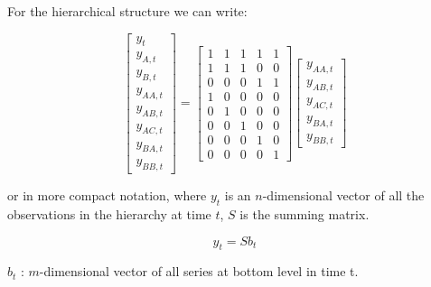 \documentclass[c, dvipsnames]{beamer}  %
\begin{document}
\begin{frame}[shrink=5]
\frametitle{\insertsection} 
\framesubtitle{\insertsubsection}


For the hierarchical structure we can write: 

\[\begin{bmatrix}
y_{t} \\
y_{A, t} \\
y_{B, t} \\
y_{AA, t} \\
y_{AB, t} \\
y_{AC, t} \\
y_{BA, t} \\
y_{BB, t}
\end{bmatrix}
=
\begin{bmatrix}
1 & 1 & 1 & 1 & 1 \\
1 & 1 & 1 & 0 & 0 \\
0 & 0 & 0 & 1 & 1 \\
1  & 0  & 0  & 0  & 0  \\
0  & 1  & 0  & 0  & 0  \\
0  & 0  & 1  & 0  & 0  \\
0  & 0  & 0  & 1  & 0  \\
0  & 0  & 0  & 0  & 1
\end{bmatrix}
\begin{bmatrix}
y_{AA, t} \\
y_{AB, t} \\
y_{AC, t} \\
y_{BA, t} \\
y_{BB, t}
\end{bmatrix}\]


or in more compact notation,  where  $y_t$   is an $n$-dimensional vector of all the observations in the hierarchy at time $t$, $S$  is the summing matrix.

$$y_t  = S b_t$$


$ b_t $ : $m$-dimensional vector of all series at
bottom level in time t.


\end{frame}
\end{document}
